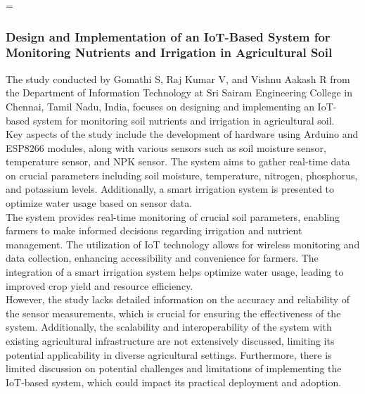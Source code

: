 =\documentclass[12pt, a4paper]{article}
\begin{document}
\subsubsection{Design and Implementation of an IoT-Based System for Monitoring Nutrients and Irrigation in Agricultural Soil}
The study conducted by Gomathi S, Raj Kumar V, and Vishnu Aakash R\cite{gomathi2022design}  from the Department of Information Technology at Sri Sairam Engineering College in Chennai, Tamil Nadu, India, focuses on designing and implementing an IoT-based system for monitoring soil nutrients and irrigation in agricultural soil.\\
Key aspects of the study include the development of hardware using Arduino and ESP8266 modules, along with various sensors such as soil moisture sensor, temperature sensor, and NPK sensor. The system aims to gather real-time data on crucial parameters including soil moisture, temperature, nitrogen, phosphorus, and potassium levels. Additionally, a smart irrigation system is presented to optimize water usage based on sensor data.\\
The system provides real-time monitoring of crucial soil parameters, enabling farmers to make informed decisions regarding irrigation and nutrient management. The utilization of IoT technology allows for wireless monitoring and data collection, enhancing accessibility and convenience for farmers. The integration of a smart irrigation system helps optimize water usage, leading to improved crop yield and resource efficiency.\\
However, the study lacks detailed information on the accuracy and reliability of the sensor measurements, which is crucial for ensuring the effectiveness of the system. Additionally, the scalability and interoperability of the system with existing agricultural infrastructure are not extensively discussed, limiting its potential applicability in diverse agricultural settings. Furthermore, there is limited discussion on potential challenges and limitations of implementing the IoT-based system, which could impact its practical deployment and adoption.
\end{document}
